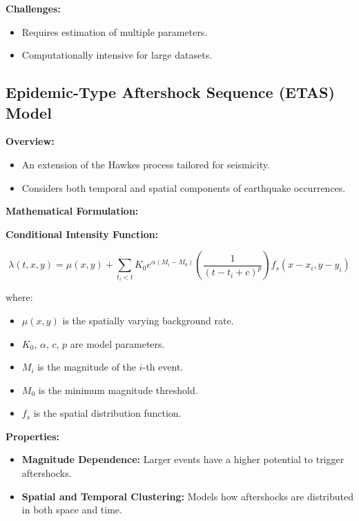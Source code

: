 \documentclass{article}
\begin{document}
\textbf{Challenges:}

\begin{itemize}
    \item Requires estimation of multiple parameters.
    \item Computationally intensive for large datasets.
\end{itemize}

\subsection{Epidemic-Type Aftershock Sequence (ETAS) Model}

\textbf{Overview:}

\begin{itemize}
    \item An extension of the Hawkes process tailored for seismicity.
    \item Considers both temporal and spatial components of earthquake occurrences.
\end{itemize}

\textbf{Mathematical Formulation:}

\textbf{Conditional Intensity Function:}

\[
\lambda(t, x, y) = \mu(x, y) + \sum_{t_i < t} K_0 e^{\alpha (M_i - M_0)} \left( \frac{1}{(t - t_i + c)^p} \right) f_s(x - x_i, y - y_i)
\]

where:

\begin{itemize}
    \item $\mu(x, y)$ is the spatially varying background rate.
    \item $K_0$, $\alpha$, $c$, $p$ are model parameters.
    \item $M_i$ is the magnitude of the $i$-th event.
    \item $M_0$ is the minimum magnitude threshold.
    \item $f_s$ is the spatial distribution function.
\end{itemize}

\textbf{Properties:}

\begin{itemize}
    \item \textbf{Magnitude Dependence:} Larger events have a higher potential to trigger aftershocks.
    \item \textbf{Spatial and Temporal Clustering:} Models how aftershocks are distributed in both space and time.
\end{itemize}
\end{document}
